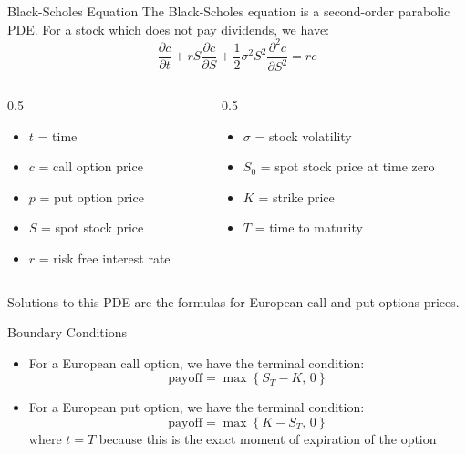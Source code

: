 \begin{frame}{Black-Scholes Equation}
    The Black-Scholes equation is a second-order parabolic PDE. For a stock which does not pay dividends, we have:
    \[\frac{\partial c}{\partial t} + r S \frac{\partial c}{\partial S} + \frac{1}{2} \sigma^2 S^2 \frac{\partial^2 c}{\partial S^2} = rc\]
    \begin{columns}[T]
        \begin{column}{0.5\textwidth}
            \begin{itemize}
                \item $t$ = time
                \item $c$ = call option price
                \item $p$ = put option price
                \item $S$ = spot stock price
                \item $r$ = risk free interest rate
            \end{itemize}
        \end{column}
        \begin{column}{0.5\textwidth}
            \begin{itemize}
                \item $\sigma$ = stock volatility
                \item $S_0$ = spot stock price at time zero
                \item $K$ = strike price
                \item $T$ = time to maturity
            \end{itemize}
        \end{column}
    \end{columns}
    
    \vspace{10pt}
    Solutions to this PDE are the formulas for European call and put options prices.
\end{frame}

\begin{frame}{Boundary Conditions}
    \begin{itemize}
        \item For a European call option, we have the terminal condition:
        \[\text{payoff} = \max\left\{S_T - K,\, 0\right\}\]
        \item For a European put option, we have the terminal condition:
        \[\text{payoff} = \max\left\{K - S_T,\, 0\right\}\]
        where $t = T$ because this is the exact moment of expiration of the option
    \end{itemize}
\end{frame}

